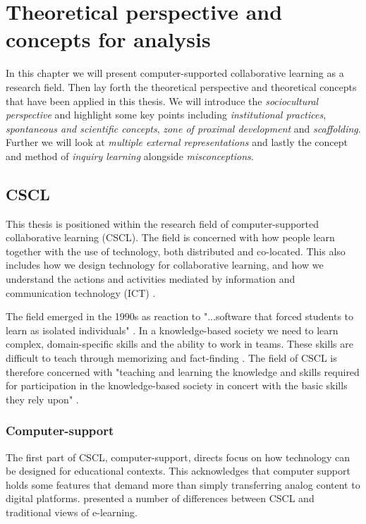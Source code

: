 \chapter{Theoretical perspective and concepts for analysis}

In this chapter we will present computer-supported collaborative learning as a research field. Then lay forth the theoretical perspective and theoretical concepts that have been applied in this thesis. We will introduce the \emph{sociocultural perspective} and highlight some key points including \emph{institutional practices}, \emph{spontaneous and scientific concepts}, \emph{zone of proximal development} and \emph{scaffolding}. Further we will look at \emph{multiple external representations} and lastly the concept and method of \emph{inquiry learning} alongside \emph{misconceptions}.

\section{CSCL}
This thesis is positioned within the research field of computer-supported collaborative learning (CSCL). The field is concerned with how people learn together with the use of technology, both distributed and co-located. This also includes how we design technology for collaborative learning, and how we understand the actions and activities mediated by information and communication technology (ICT) \citep{stahl2006computer,ludvigsen2010computer}.  

The field emerged in the 1990s as reaction to "...software that forced students to learn as isolated individuals" \citep{stahl2006computer}. In a knowledge-based society we need to learn complex, domain-specific skills and the ability to work in teams. These skills are difficult to teach through memorizing and fact-finding \citep{sfard1998two,ludvigsen2010computer}. The field of CSCL is therefore concerned with "teaching and learning the knowledge and skills required for participation in the knowledge-based society in concert with the basic skills they rely upon" \citep[p. 2]{ludvigsen2010computer}.

\subsection{Computer-support}
The first part of CSCL, computer-support, directs focus on how technology can be designed for educational contexts. This acknowledges that computer support holds some features that demand more than simply transferring analog content to digital platforms. \citet{stahl2006computer} presented a number of differences between CSCL and traditional views of e-learning. 


